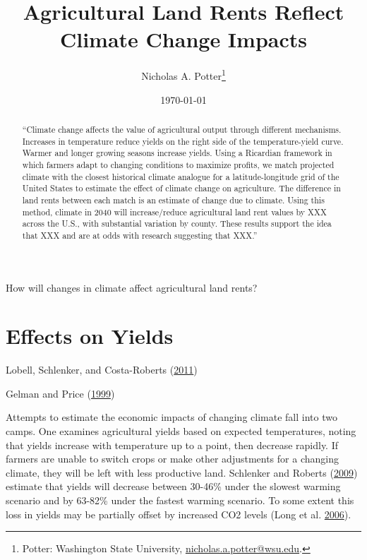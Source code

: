 \documentclass[AER]{AEA}
\begin{document}
\title{Agricultural Land Rents Reflect Climate Change Impacts}


\author{
  Nicholas A. Potter\thanks{
  Potter: Washington State University, \href{mailto:nicholas.a.potter@wsu.edu}{nicholas.a.potter@wsu.edu}.
}
}

\date{\today}

\begin{abstract}
``Climate change affects the value of agricultural output through
different mechanisms. Increases in temperature reduce yields on the
right side of the temperature-yield curve. Warmer and longer growing
seasons increase yields. Using a Ricardian framework in which farmers
adapt to changing conditions to maximize profits, we match projected
climate with the closest historical climate analogue for a
latitude-longitude grid of the United States to estimate the effect of
climate change on agriculture. The difference in land rents between each
match is an estimate of change due to climate. Using this method,
climate in 2040 will increase/reduce agricultural land rent values by
XXX across the U.S., with substantial variation by county. These results
support the idea that XXX and are at odds with research suggesting that
XXX.''
\end{abstract}


\maketitle

How will changes in climate affect agricultural land rents?

\section{Effects on Yields}\label{effects-on-yields}

Lobell, Schlenker, and Costa-Roberts
(\protect\hyperlink{ref-LobellSchlenkerCosta-Roberts2011}{2011})

Gelman and Price (\protect\hyperlink{ref-GelmanPrice1999}{1999})

Attempts to estimate the economic impacts of changing climate fall into
two camps. One examines agricultural yields based on expected
temperatures, noting that yields increase with temperature up to a
point, then decrease rapidly. If farmers are unable to switch crops or
make other adjustments for a changing climate, they will be left with
less productive land. Schlenker and Roberts
(\protect\hyperlink{ref-SchlenkerRoberts2009}{2009}) estimate that
yields will decrease between 30-46\% under the slowest warming scenario
and by 63-82\% under the fastest warming scenario. To some extent this
loss in yields may be partially offset by increased CO2 levels (Long et
al. \protect\hyperlink{ref-LongETAL2006}{2006}).
\end{document}
